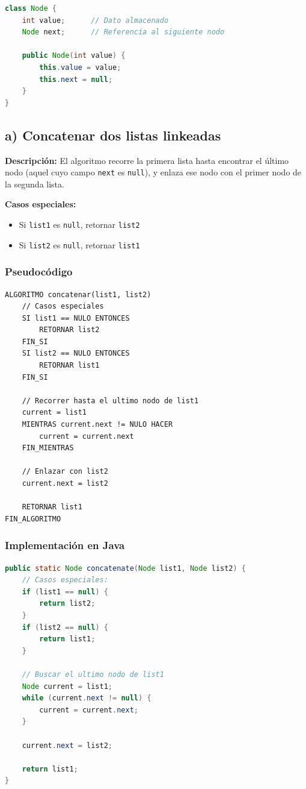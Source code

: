 \documentclass[12pt]{article}
\newcommand{\codigo}[1]{\texttt{\small #1}}
\begin{document}
\begin{lstlisting}[style=estilo_base, language=Java]
class Node {
    int value;      // Dato almacenado
    Node next;      // Referencia al siguiente nodo
    
    public Node(int value) {
        this.value = value;
        this.next = null;
    }
}
\end{lstlisting}

\subsection*{a) Concatenar dos listas linkeadas}

\textbf{Descripción:} El algoritmo recorre la primera lista hasta encontrar el último nodo (aquel cuyo campo \codigo{next} es \codigo{null}), y enlaza ese nodo con el primer nodo de la segunda lista.

\textbf{Casos especiales:}
\begin{itemize}
    \item Si \codigo{list1} es \codigo{null}, retornar \codigo{list2}
    \item Si \codigo{list2} es \codigo{null}, retornar \codigo{list1}
\end{itemize}

\newpage
\subsubsection*{Pseudocódigo}

\begin{lstlisting}[style=pseudocodigo]
ALGORITMO concatenar(list1, list2)
    // Casos especiales
    SI list1 == NULO ENTONCES
        RETORNAR list2
    FIN_SI
    SI list2 == NULO ENTONCES
        RETORNAR list1
    FIN_SI

    // Recorrer hasta el ultimo nodo de list1
    current = list1
    MIENTRAS current.next != NULO HACER
        current = current.next
    FIN_MIENTRAS

    // Enlazar con list2
    current.next = list2

    RETORNAR list1
FIN_ALGORITMO
\end{lstlisting}

\subsubsection*{Implementación en Java}

\begin{lstlisting}[style=estilo_base, language=Java]
public static Node concatenate(Node list1, Node list2) {
    // Casos especiales:
    if (list1 == null) {
        return list2;
    }
    if (list2 == null) {
        return list1;
    }
    
    // Buscar el ultimo nodo de list1
    Node current = list1;
    while (current.next != null) {
        current = current.next;
    }
    
    current.next = list2;
    
    return list1;
}
\end{lstlisting}
\end{document}
